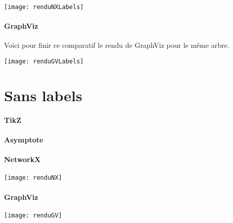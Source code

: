 \begin{center}
\texttt{[image: renduNXLabels]}
\end{center}
	
\paragraph{GraphViz} Voici pour finir ce comparatif le rendu de GraphViz pour le même arbre.\\

\begin{center}
\texttt{[image: renduGVLabels]}
\end{center}
	
	\section{Sans labels}

\paragraph{TikZ}

\begin{center}
\resizebox {!}{0.50\columnwidth} {
}
\end{center}

\paragraph{Asymptote}

\begin{center}

\end{center}

\paragraph{NetworkX}

\begin{center}
\texttt{[image: renduNX]}
\end{center}
	
\paragraph{GraphViz}

\begin{center}
\texttt{[image: renduGV]}
\end{center}